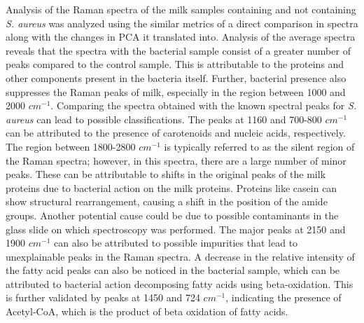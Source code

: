 \noindent Analysis of the Raman spectra of the milk samples containing and not containing \textit{S. aureus} was analyzed using the similar metrics of a direct comparison in spectra along with the changes in PCA it translated into. Analysis of the average spectra reveals that the spectra with the bacterial sample consist of a greater number of peaks compared to the control sample. This is attributable to the proteins and other components present in the bacteria itself. Further, bacterial presence also suppresses the Raman peaks of milk, especially in the region between 1000 and 2000 $cm^{-1}$. Comparing the spectra obtained with the known spectral peaks for \textit{S. aureus} can lead to possible classifications. The peaks at 1160 and 700-800 $cm^{-1}$ can be attributed to the presence of carotenoids and nucleic acids, respectively. \cite{Liu2025_RamanSingleCell} The region between 1800-2800 $cm^{-1}$ is typically referred to as the silent region of the Raman spectra; however, in this spectra, there are a large number of minor peaks. These can be attributable to shifts in the original peaks of the milk proteins due to bacterial action on the milk proteins. Proteins like casein can show structural rearrangement, causing a shift in the position of the amide groups. Another potential cause could be due to possible contaminants in the glass slide on which spectroscopy was performed. The major peaks at 2150 and 1900 $cm^{-1}$ can also be attributed to possible impurities that lead to unexplainable peaks in the Raman spectra. A decrease in the relative intensity of the fatty acid peaks can also be noticed in the bacterial sample, which can be attributed to bacterial action decomposing fatty acids using beta-oxidation. \cite{Kuiack2023_fadXDEBA} This is further validated by peaks at 1450 and 724 $cm^{-1}$, indicating the presence of Acetyl-CoA, which is the product of beta oxidation of fatty acids. \cite{Wang2023_RiP_SERS_DeepOcean} \\

